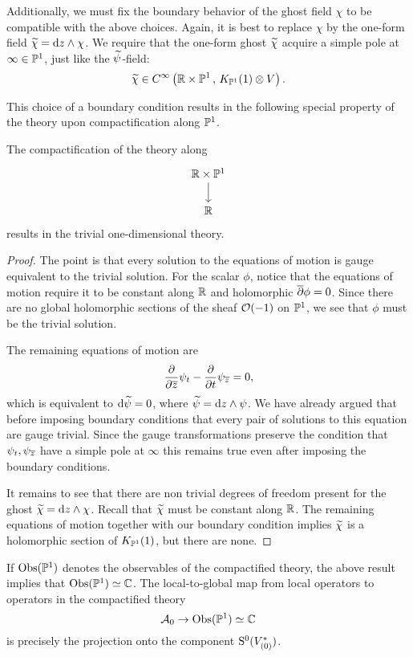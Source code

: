 \documentclass[11pt]{amsart}
\begin{document}
Additionally, we must fix the boundary behavior of the ghost field $\chi$ to be compatible with the above choices.
Again, it is best to replace $\chi$ by the one-form field $\widetilde \chi = {\rm d} z \wedge \chi$. 
We require that the one-form ghost $\widetilde \chi$ acquire a simple pole at $\infty \in \mathbb P^1$, just like the $\widetilde \psi$-field:
\[
\widetilde\chi \in C^\infty\left(\mathbb R \times \mathbb P^1 \, , \, K_{\mathbb P^1}(1) \otimes V\right) .
\]

This choice of a boundary condition results in the following special property of the theory upon compactification along $\mathbb P^1$.

\begin{lem}\label{lem:compactP1}
The compactification of the theory along 
\[
\begin{tikzcd}
\RR \times \PP^1 \ar[d] \\ \RR
\end{tikzcd}
\]
results in the trivial one-dimensional theory. 
\end{lem}
\begin{proof}
The point is that every solution to the equations of motion is gauge equivalent to the trivial solution. 
For the scalar $\phi$, notice that the equations of motion require it to be constant along $\mathbb R$ and holomorphic $\overline{\partial} \phi = 0$. 
Since there are no global holomorphic sections of the sheaf $\mathcal O(-1)$ on $\mathbb P^1$, we see that $\phi$ must be the trivial solution. 

The remaining equations of motion are
\[
\frac{\partial}{\partial {\overline{z}}} \psi_t - \frac{\partial}{\partial t} \psi_{\overline{z}} = 0 ,
\]
which is equivalent to ${\rm d} \widetilde \psi = 0$, where $\widetilde \psi = {\rm d} z \wedge \psi$. 
We have already argued that before imposing boundary conditions that every pair of solutions to this equation are gauge trivial. 
Since the gauge transformations preserve the condition that $\psi_t, \psi_{{\overline{z}}}$ have a simple pole at $\infty$ this remains true even after imposing the boundary conditions. 

It remains to see that there are non trivial degrees of freedom present for the ghost $\widetilde\chi = {\rm d} z \wedge \chi$. 
Recall that $\widetilde\chi$ must be constant along $\mathbb R$.
The remaining equations of motion together with our boundary condition implies $\widetilde \chi$ is a holomorphic section of $K_{\mathbb P^1}(1)$, but there are none. 
\end{proof}

If ${\rm Obs}(\mathbb P^1)$ denotes the observables of the compactified theory, the above result implies that ${\rm Obs}(\mathbb P^1) \simeq \mathbb C$. 
The local-to-global map from local operators to operators in the compactified theory
\[
\mathcal A_0 \to {\rm Obs}(\mathbb P^1) \simeq \mathbb C
\]
is precisely the projection onto the component ${\rm S}^0(V^*_{(0)})$. 
\end{document}
